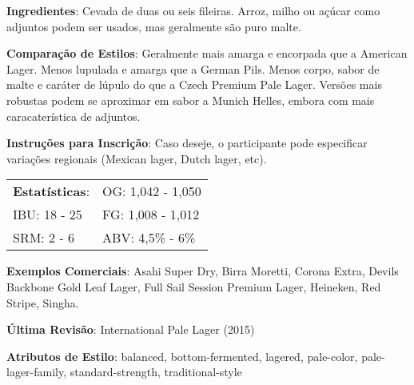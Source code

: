 \textbf{Ingredientes}: Cevada de duas ou seis fileiras. Arroz, milho ou açúcar como adjuntos podem ser usados, mas geralmente são puro malte.

\textbf{Comparação de Estilos}: Geralmente mais amarga e encorpada que a American Lager. Menos lupulada e amarga que a German Pils. Menos corpo, sabor de malte e caráter de lúpulo do que a Czech Premium Pale Lager. Versões mais robustas podem se aproximar em sabor a Munich Helles, embora com mais caracaterística de adjuntos.

\textbf{Instruções para Inscrição}: Caso deseje, o participante pode especificar variações regionais (Mexican lager, Dutch lager, etc).

\begin{tabular}{@{}p{35mm}p{35mm}@{}}
  \textbf{Estatísticas}: & OG: 1,042 - 1,050 \\
  IBU: 18 - 25  & FG: 1,008 - 1,012  \\
  SRM: 2 - 6   & ABV: 4,5\% - 6\%
\end{tabular}

\textbf{Exemplos Comerciais}: Asahi Super Dry, Birra Moretti, Corona Extra, Devils Backbone Gold Leaf Lager, Full Sail Session Premium Lager, Heineken, Red Stripe, Singha.

\textbf{Última Revisão}: International Pale Lager (2015)

\textbf{Atributos de Estilo}: balanced, bottom-fermented, lagered, pale-color, pale-lager-family, standard-strength, traditional-style